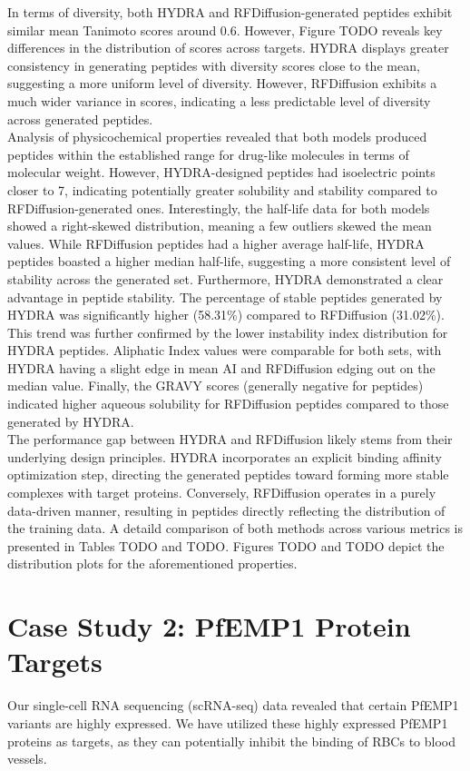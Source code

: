In terms of diversity, both HYDRA and RFDiffusion-generated peptides exhibit similar mean Tanimoto scores around 0.6. However, Figure TODO reveals key differences in the distribution of scores across targets. HYDRA displays greater consistency in generating peptides with diversity scores close to the mean, suggesting a more uniform level of diversity. However, RFDiffusion exhibits a much wider variance in scores, indicating a less predictable level of diversity across generated peptides. \\

Analysis of physicochemical properties revealed that both models produced peptides within the established range for drug-like molecules in terms of molecular weight. However, HYDRA-designed peptides had isoelectric points closer to 7, indicating potentially greater solubility and stability compared to RFDiffusion-generated ones. Interestingly, the half-life data for both models showed a right-skewed distribution, meaning a few outliers skewed the mean values. While RFDiffusion peptides had a higher average half-life, HYDRA peptides boasted a higher median half-life, suggesting a more consistent level of stability across the generated set. Furthermore, HYDRA demonstrated a clear advantage in peptide stability. The percentage of stable peptides generated by HYDRA was significantly higher (58.31\%) compared to RFDiffusion (31.02\%). This trend was further confirmed by the lower instability index distribution for HYDRA peptides. Aliphatic Index values were comparable for both sets, with HYDRA having a slight edge in mean AI and RFDiffusion edging out on the median value. Finally, the GRAVY scores (generally negative for peptides) indicated higher aqueous solubility for RFDiffusion peptides compared to those generated by HYDRA. \\

The performance gap between HYDRA and RFDiffusion likely stems from their underlying design principles. HYDRA incorporates an explicit binding affinity optimization step, directing the generated peptides toward forming more stable complexes with target proteins. Conversely, RFDiffusion operates in a purely data-driven manner, resulting in peptides directly reflecting the distribution of the training data.
A detaild comparison of both methods across various metrics is presented in Tables TODO and TODO. Figures TODO and TODO depict the distribution plots for the aforementioned properties.

\section{Case Study 2: PfEMP1 Protein Targets}
Our single-cell RNA sequencing (scRNA-seq) data revealed that certain PfEMP1 variants are highly expressed. We have utilized these highly expressed PfEMP1 proteins as targets, as they can potentially inhibit the binding of RBCs to blood vessels. \\


